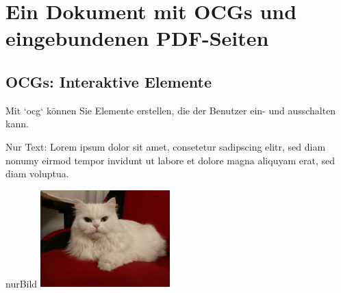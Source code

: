 \documentclass{article}
\begin{document}
\section{Ein Dokument mit OCGs und eingebundenen PDF-Seiten}

\subsection{OCGs: Interaktive Elemente}

Mit `ocg` können Sie Elemente erstellen, die der Benutzer ein- und ausschalten kann.

\begin{ocg}

Nur Text: Lorem ipsum dolor sit amet, consetetur sadipscing elitr, sed diam nonumy eirmod tempor invidunt ut labore et dolore magna aliquyam erat, sed diam voluptua.  


\begin{ocg}{nurBild}
\includegraphics[width=5cm]{Bilder/Katze}
\end{ocg}
\end{ocg}
\end{document}
